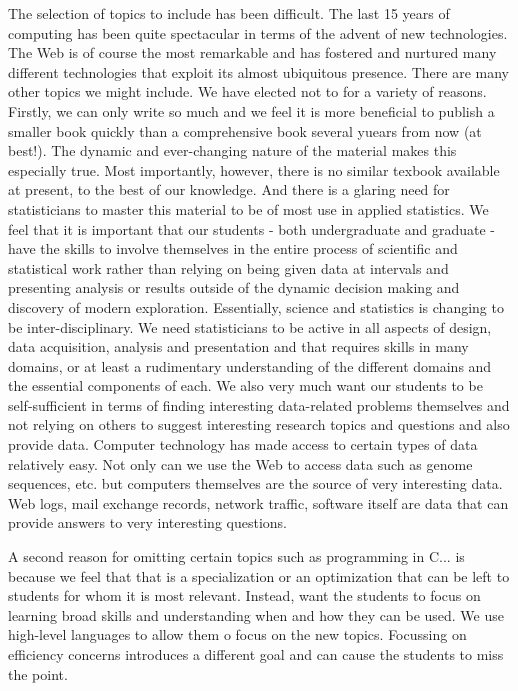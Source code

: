 The selection of topics to include has been difficult.  The last 15
years of computing has been quite spectacular in terms of the advent
of new technologies.  The Web is of course the most remarkable and has
fostered and nurtured many different technologies that exploit its
almost ubiquitous presence.  There are many other topics we might
include.  We have elected not to for a variety of reasons.  Firstly,
we can only write so much and we feel it is more beneficial to publish
a smaller book quickly than a comprehensive book several yuears from
now (at best!).  The dynamic and ever-changing nature of the material
makes this especially true. Most importantly, however, there is no
similar texbook available at present, to the best of our knowledge.
And there is a glaring need for statisticians to master this material
to be of most use in applied statistics. We feel that it is important
that our students - both undergraduate and graduate - have the skills
to involve themselves in the entire process of scientific and
statistical work rather than relying on being given data at intervals
and presenting analysis or results outside of the dynamic decision
making and discovery of modern exploration.  Essentially, science and
statistics is changing to be inter-disciplinary.  We need
statisticians to be active in all aspects of design, data acquisition,
analysis and presentation and that requires skills in many domains, or
at least a rudimentary understanding of the different domains and the
essential components of each.  We also very much want our students to
be self-sufficient in terms of finding interesting data-related
problems themselves and not relying on others to suggest interesting
research topics and questions and also provide data.  Computer
technology has made access to certain types of data relatively easy.
Not only can we use the Web to access data such as genome sequences,
etc. but computers themselves are the source of very interesting data.
Web logs, mail exchange records, network traffic, software itself are
data that can provide answers to very interesting questions.


A second reason for omitting certain topics such as programming in
C...  is because we feel that that is a specialization or an
optimization that can be left to students for whom it is most
relevant.  Instead, want the students to focus on learning broad
skills and understanding when and how they can be used.  We use
high-level languages to allow them o focus on the new topics.
Focussing on efficiency concerns introduces a different goal and can
cause the students to miss the point.
 
